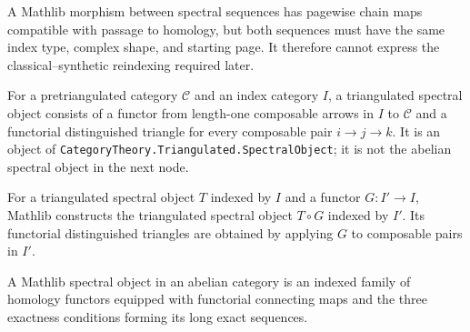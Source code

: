 \begin{definition}
  \label{def:mathlib-spectral-sequence-hom}
  \mathlibok
  A Mathlib morphism between spectral sequences has pagewise chain maps
  compatible with passage to homology, but both sequences must have the same
  index type, complex shape, and starting page.  It therefore cannot express
  the classical--synthetic reindexing required later.
\end{definition}

\begin{definition}
  \label{def:mathlib-triangulated-spectral-object}
  \mathlibok
  For a pretriangulated category $\mathcal C$ and an index category $I$, a
  triangulated spectral object consists of a functor from length-one composable
  arrows in $I$ to $\mathcal C$ and a functorial distinguished triangle for
  every composable pair $i\to j\to k$.  It is an object of
  \texttt{CategoryTheory.Triangulated.SpectralObject}; it is not the abelian
  spectral object in the next node.
\end{definition}

\begin{definition}
  \label{def:mathlib-triangulated-spectral-object-precomp}
  \mathlibok
  For a triangulated spectral object $T$ indexed by $I$ and a functor
  $G:I'\to I$, Mathlib constructs the triangulated spectral object
  $T\circ G$ indexed by $I'$.  Its functorial distinguished triangles are
  obtained by applying $G$ to composable pairs in $I'$.
\end{definition}

\begin{definition}
  \label{def:mathlib-spectral-object}
  \mathlibok
  A Mathlib spectral object in an abelian category is an indexed family of
  homology functors equipped with functorial connecting maps and the three
  exactness conditions forming its long exact sequences.
\end{definition}

